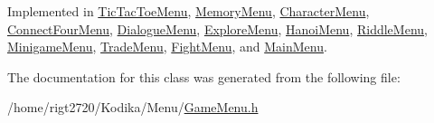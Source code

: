 Implemented in \hyperlink{classTicTacToeMenu_ab736aba3ecb23a6b28cde04729556088}{Tic\-Tac\-Toe\-Menu}, \hyperlink{classMemoryMenu_acde088f671d95d13f50b27ac345d2968}{Memory\-Menu}, \hyperlink{classCharacterMenu_a4f03af624e0a914316b4044e203cb45f}{Character\-Menu}, \hyperlink{classConnectFourMenu_a6a826d0810795584cfb4b601d5cd5df2}{Connect\-Four\-Menu}, \hyperlink{classDialogueMenu_a0d9ad90b84f6b104b673be1ff66185c2}{Dialogue\-Menu}, \hyperlink{classExploreMenu_a01fdbb56ef495290e825ec9a57ecd2b6}{Explore\-Menu}, \hyperlink{classHanoiMenu_a0280d0e443642407fda5903346be1a39}{Hanoi\-Menu}, \hyperlink{classRiddleMenu_a2d103283c58744ffa0e77e62a24e7ccb}{Riddle\-Menu}, \hyperlink{classMinigameMenu_abde3ae319bf1660a8626c6f765e054a8}{Minigame\-Menu}, \hyperlink{classTradeMenu_aaf93d0a5ee2574d2926bd22de278fb17}{Trade\-Menu}, \hyperlink{classFightMenu_a234a915424eb00727d304834a4af352c}{Fight\-Menu}, and \hyperlink{classMainMenu_a44ab04810a68d7ddf3843464573b7967}{Main\-Menu}.



The documentation for this class was generated from the following file\-:\begin{DoxyCompactItemize}
\item 
/home/rigt2720/\-Kodika/\-Menu/\hyperlink{GameMenu_8h}{Game\-Menu.\-h}\end{DoxyCompactItemize}
